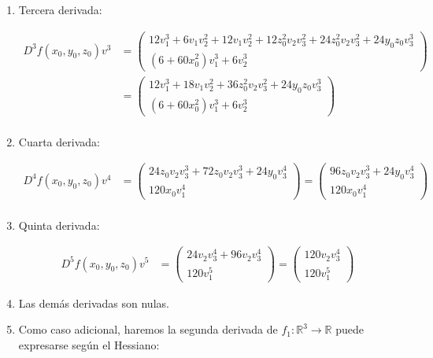 \begin{exmp}
\begin{enumerate}
		\item Tercera derivada: 
		
		\begin{align*}
			D^3f(x_0,y_0,z_0) v^3 
			&= \begin{pmatrix}
				12 v_1^3  +6v_1v_2^2 + 12  v_1 v_2^2  + 12z_0^2 v_2v_3^2+ 24z_0^2 v_2v_3^2 + 24y_0z_0 v_3^3 \\
				(6+ 60x_0^2) v_1 ^3  + 6v_2^3    
			\end{pmatrix} \\
			&= \begin{pmatrix}
				12v_1^3  +18v_1v_2^2   + 36z_0^2 v_2v_3^2 + 24y_0z_0 v_3^3 \\
				(6+ 60x_0^2) v_1 ^3  + 6v_2^3    
			\end{pmatrix} \\
		\end{align*}
		
		\item Cuarta derivada:
		
		\begin{align*}
			D^4f(x_0,y_0,z_0) v^4 
			&= \begin{pmatrix}
				24z_0 v_2 v_3^3 +   72z_0 v_2v_3^3 + 24y_0v_3^4  \\
				120x_0 v_1 ^4      
			\end{pmatrix} = \begin{pmatrix}
				96z_0 v_2v_3^3 + 24y_0v_3^4  \\
				120x_0 v_1 ^4      
			\end{pmatrix} \\
		\end{align*}
		
		\item Quinta derivada:
		
		\begin{align*}
			D^5f(x_0,y_0,z_0) v^5
			&= \begin{pmatrix}
				24v_2v_3^4 + 96v_2v_3^4   \\
				120 v_1 ^5      
			\end{pmatrix} = \begin{pmatrix}
				120 v_2v_3^4   \\
				120 v_1 ^5      
			\end{pmatrix} 
		\end{align*}
		
		\item Las demás derivadas son nulas.
		
		\item Como caso adicional, haremos la segunda derivada de $f_1:\mathbb{R}^3 \to \mathbb{R}$ puede expresarse según el Hessiano:
		

\end{enumerate}
\end{exmp}
